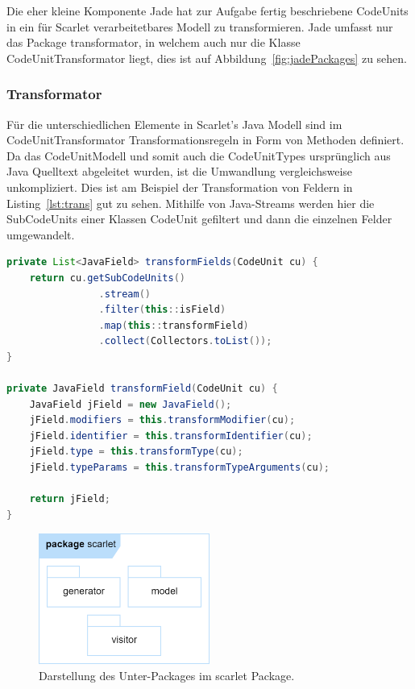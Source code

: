 \documentclass[12pt,oneside,a4paper,parskip]{scrbook}
\begin{document}
Die eher kleine Komponente Jade hat zur Aufgabe fertig beschriebene CodeUnits in ein für Scarlet verarbeitetbares Modell zu transformieren. Jade umfasst nur das Package transformator, in welchem auch nur die Klasse CodeUnitTransformator liegt, dies ist auf Abbildung~\ref{fig:jadePackages} zu sehen.

\subsubsection{Transformator}

Für die unterschiedlichen Elemente in Scarlet's Java Modell sind im CodeUnitTransformator Transformationsregeln in Form von Methoden definiert. Da das CodeUnitModell und somit auch die CodeUnitTypes ursprünglich aus Java Quelltext abgeleitet wurden, ist die Umwandlung vergleichsweise unkompliziert. Dies ist am Beispiel der Transformation von Feldern in Listing~\ref{lst:trans} gut zu sehen. Mithilfe von Java-Streams werden hier die SubCodeUnits einer Klassen CodeUnit gefiltert und dann die einzelnen Felder umgewandelt.

\begin{lstlisting}[label=lst:trans,
language=java,
firstnumber=1,
caption=Umwandlung der Felder in den SubCodeUnits einer CodeUnit. Auszug aus der Klasse CodeUnitTransformator.]
private List<JavaField> transformFields(CodeUnit cu) {
	return cu.getSubCodeUnits()
				.stream()
				.filter(this::isField)
				.map(this::transformField)
				.collect(Collectors.toList());
}

private JavaField transformField(CodeUnit cu) {
	JavaField jField = new JavaField();
	jField.modifiers = this.transformModifier(cu);
	jField.identifier = this.transformIdentifier(cu);
	jField.type = this.transformType(cu);
	jField.typeParams = this.transformTypeArguments(cu);
	
	return jField;
}
\end{lstlisting}

\begin{figure}[htbp]
	\centering
	\includegraphics[width=0.5\textwidth]{bilder/scarlet}
	\caption{Darstellung des Unter-Packages im scarlet Package.}
	\label{fig:scarletPackages}
\end{figure}
\end{document}
